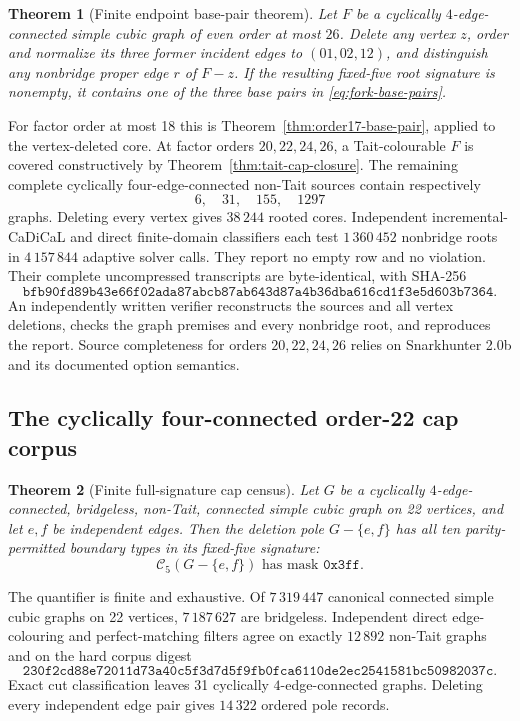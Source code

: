 \documentclass[11pt]{article}
\newtheorem{theorem}{Theorem}[section]
\theoremstyle{definition}
\theoremstyle{remark}
\begin{document}
\begin{theorem}[Finite endpoint base-pair theorem]
\label{thm:endpoint-through26}
Let \(F\) be a cyclically \(4\)-edge-connected simple cubic graph of
even order at most \(26\).  Delete any vertex \(z\), order and normalize
its three former incident edges to \((01,02,12)\), and distinguish any
nonbridge proper edge \(r\) of \(F-z\).  If the resulting fixed-five
root signature is nonempty, it contains one of the three base pairs
in \eqref{eq:fork-base-pairs}.
\end{theorem}

For factor order at most 18 this is
Theorem~\ref{thm:order17-base-pair}, applied to the vertex-deleted
core.  At factor orders \(20,22,24,26\), a Tait-colourable \(F\) is
covered constructively by Theorem~\ref{thm:tait-cap-closure}.  The
remaining complete cyclically four-edge-connected non-Tait sources
contain respectively
\[
                         6,\quad31,\quad155,\quad1297
\]
graphs.  Deleting every vertex gives \(38\,244\) rooted cores.
Independent incremental-CaDiCaL and direct finite-domain classifiers
each test \(1\,360\,452\) nonbridge roots in \(4\,157\,844\) adaptive
solver calls.  They report no empty row and no violation.  Their
complete uncompressed transcripts are byte-identical, with SHA-256
\[
\texttt{bfb90fd89b43e66f02ada87abcb87ab643d87a4b36dba616cd1f3e5d603b7364}.
\]
An independently written verifier reconstructs the sources and all
vertex deletions, checks the graph premises and every nonbridge root,
and reproduces the report.  Source completeness for orders
\(20,22,24,26\) relies on Snarkhunter 2.0b and its documented option
semantics.

\subsection{The cyclically four-connected order-22 cap corpus}

\begin{theorem}[Finite full-signature cap census]
\label{thm:cyclic4-cap-census}
Let \(G\) be a cyclically \(4\)-edge-connected, bridgeless, non-Tait,
connected simple cubic graph on 22 vertices, and let \(e,f\) be
independent edges.  Then the deletion pole \(G-\{e,f\}\) has all ten
parity-permitted boundary types in its fixed-five signature:
\[
                         \mathcal C_5(G-\{e,f\})
                         \text{ has mask }\texttt{0x3ff}.
\]
\end{theorem}

The quantifier is finite and exhaustive.  Of \(7\,319\,447\) canonical
connected simple cubic graphs on 22 vertices, \(7\,187\,627\) are
bridgeless.  Independent direct edge-colouring and perfect-matching
filters agree on exactly \(12\,892\) non-Tait graphs and on the hard
corpus digest
\[
\texttt{230f2cd88e72011d73a40c5f3d7d5f9fb0fca6110de2ec2541581bc50982037c}.
\]
Exact cut classification leaves 31 cyclically \(4\)-edge-connected
graphs.  Deleting every independent edge pair gives \(14\,322\)
ordered pole records.
\end{document}
